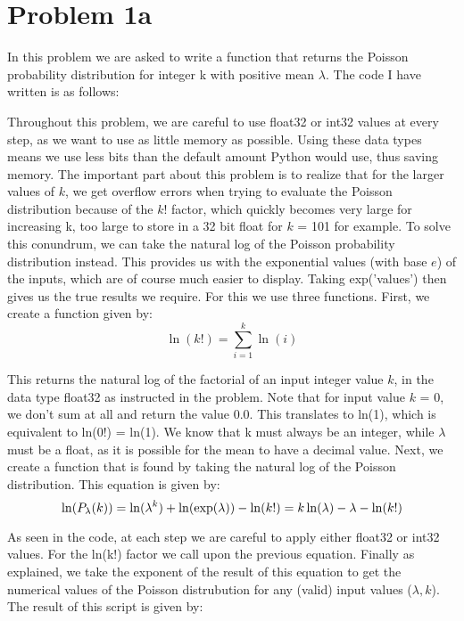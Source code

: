 \section{Problem 1a}

In this problem we are asked to write a function that returns the Poisson probability distribution for integer k with positive mean $\lambda$. The code I have written is as follows: 



Throughout this problem, we are careful to use float32 or int32 values at every step, as we want to use as little memory as possible. Using these data types means we use less bits than the default amount Python would use, thus saving memory. The important part about this problem is to realize that for the larger values of $k$, we get overflow errors when trying to evaluate the Poisson distribution because of the $k!$ factor, which quickly becomes very large for increasing k, too large to store in a 32 bit float for $k$ = 101 for example. To solve this conundrum, we can take the natural log of the Poisson probability distribution instead. This provides us with the exponential values (with base $e$) of the inputs, which are of course much easier to display. Taking exp('values') then gives us the true results we require. For this we use three functions.
First, we create a function given by:\\

\begin{equation}
	\ln(k!) = \sum_{i=1}^{k} \ln(i)
\end{equation}

This returns the natural log of the factorial of an input integer value $k$, in the data type float32 as instructed in the problem. Note that for input value $k$ = 0, we don't sum at all and return the value 0.0. This translates to ln(1), which is equivalent to ln(0!) = ln(1). We know that k must always be an integer, while $\lambda$ must be a float, as it is possible for the mean to have a decimal value. Next, we create a function that is found by taking the natural log of the Poisson distribution. This equation is given by:\\

\begin{equation}
	\ln (P_{\lambda}(k)) = \ln(\lambda^k) + \ln(\exp(\-\lambda)) - \ln(k!) = k \ln(\lambda) - \lambda - \ln(k!)
\end{equation}

As seen in the code, at each step we are careful to apply either float32 or int32 values. For the ln(k!) factor we call upon the previous equation. Finally as explained, we take the exponent of the result of this equation to get the numerical values of the Poisson distrubution for any (valid) input values ($\lambda,k$). The result of this script is given by:

